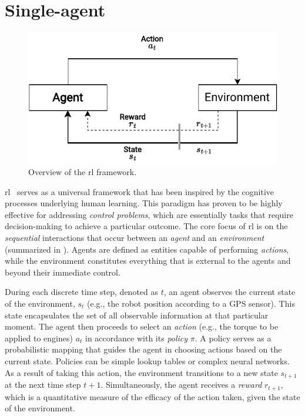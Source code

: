 \section{Single-agent}\label{chap:rl:single}
\begin{figure}
  \includegraphics[width=\textwidth]{chapters/img/single-agent-rl.drawio.pdf}
  \caption{Overview of the \ac{rl} framework.}\label{fig:rl:overview}
\end{figure}
\Acl{rl}~\cite{sutton-book} serves as a universal framework 
 that has been inspired by the cognitive processes underlying human learning. 
 This paradigm has proven to be highly effective for addressing \emph{control problems}, 
 which are essentially tasks that require decision-making to achieve a particular outcome.
%
The core focus of \ac{rl} is on the \emph{sequential} interactions that occur between an \emph{agent} 
 and an \emph{environment} (summarized in ). 
 Agents are defined as entities capable of performing \emph{actions}, 
 while the environment constitutes everything that is external to the agents 
 and beyond their immediate control.

During each discrete time step, 
 denoted as $t$, an agent observes the current state of the environment, 
 $s_t$ (e.g., the robot position according to a GPS sensor). 
This state encapsulates the set of all observable information at that particular moment. 
The agent then proceeds to select an \emph{action} 
 (e.g., the torque to be applied to engines) 
 $a_t$ in accordance with its \emph{policy} $\pi$. 
A policy serves as a probabilistic mapping that guides the agent in choosing actions 
 based on the current state. 
 Policies can be simple lookup tables or complex neural networks.
%
As a result of taking this action, 
 the environment transitions to a new state $s_{t+1}$ at the next time step $t+1$. 
 Simultaneously, the agent receives a \emph{reward} $r_{t+1}$, 
 which is a quantitative measure of the efficacy of the action taken, 
 given the state of the environment.

